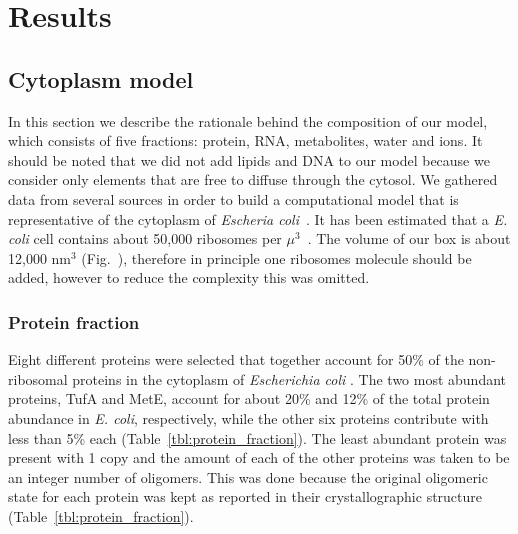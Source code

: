 \documentclass[journal=jpcisd8,manuscript=article]{achemso}
\newcommand{\figref}[1]{Fig.~\plainref{#1}}
\begin{document}
\section*{Results}

\subsection{Cytoplasm model}
In this section we describe the rationale behind the composition of
our model, which consists of five fractions: protein, RNA, metabolites, water
and ions. It should be noted that we did not add lipids and DNA to our
model because we consider only elements that are free to diffuse
through the cytosol. We gathered data from several sources in order to
build a computational model that is representative of the cytoplasm of
{\em Escheria coli}~\cite{Dong1996,Bennett2009,Link1997,Mcguffee2010}.
It has been estimated that a {\em E. coli} cell contains about 50,000 ribosomes per $\mu^3$~\cite{Milo2017a}. The volume of our box is about 12,000 nm$^3$ (\figref{shrink}), therefore in principle one ribosomes molecule should be added, however to reduce the complexity this was omitted. 

\subsubsection{Protein fraction}
Eight different proteins were selected that together account for 50\%
of the non-ribosomal proteins in the cytoplasm of {\em Escherichia
  coli} \cite{Link1997}. The two most abundant proteins, TufA and
MetE, account for about 20\% and 12\% of the total protein abundance
in {\em E. coli}, respectively, while the other six proteins
contribute with less than 5\% each (Table~\ref{tbl:protein_fraction}).
The least abundant protein was present with 1 copy and the amount of
each of the other proteins was taken to be an integer number of
oligomers. This was done because the original oligomeric state for
each protein was kept as reported in their crystallographic structure
(Table~\ref{tbl:protein_fraction}).
\end{document}
